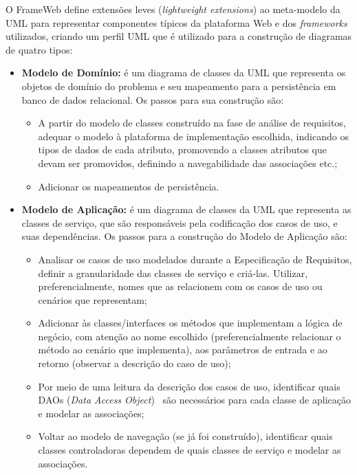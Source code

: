 O FrameWeb define extensões leves (\textit{lightweight extensions}) ao meta-modelo da UML para representar componentes típicos da plataforma Web e dos \textit{frameworks} utilizados, criando um perfil UML que é utilizado para a construção de diagramas de quatro tipos:

\begin{itemize}
	\item \textbf{Modelo de Domínio:} é um diagrama de classes da UML que representa os objetos de domínio do problema e seu mapeamento para a persistência em banco de dados relacional. Os passos para sua construção são:
	
	\begin{itemize}
		\item A partir do modelo de classes construído na fase de análise de requisitos, adequar o modelo à plataforma de implementação escolhida, indicando os tipos de dados de cada atributo, promovendo a classes atributos que devam ser promovidos, definindo a navegabilidade das associações etc.;
		\item Adicionar os mapeamentos de persistência.	
		
	\end{itemize}
	
	\item \textbf{Modelo de Aplicação:} é um diagrama de classes da UML que representa as classes de serviço, que são responsáveis pela codificação dos casos de uso, e suas dependências. Os passos para a construção do Modelo de Aplicação são:	
	\begin{itemize}
		\item Analisar os casos de uso modelados durante a Especificação de Requisitos, definir a granularidade das classes de serviço e criá-las. Utilizar, preferencialmente, nomes que as relacionem com os casos de uso ou cenários que representam;
		
		\item Adicionar às classes/interfaces os métodos que implementam a lógica de negócio, com atenção ao nome escolhido (preferencialmente relacionar o método ao cenário que implementa), aos parâmetros de entrada e ao retorno (observar a descrição do caso de uso);
		
		\item Por meio de uma leitura da descrição dos casos de uso, identificar quais DAOs (\textit{Data Access Object})~\cite{alurDAO} são necessários para cada classe de aplicação e modelar as associações;
		
		\item Voltar ao modelo de navegação (se já foi construído), identificar quais classes controladoras dependem de quais classes de serviço e modelar as associações.
	\end{itemize}
	

\end{itemize}
